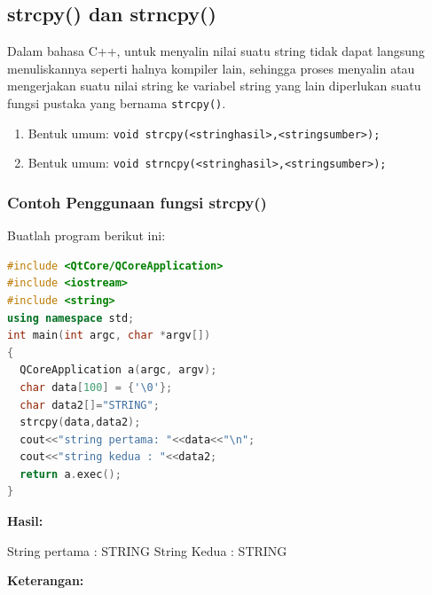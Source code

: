 \subsection{strcpy() dan strncpy()}\label{strcpy-dan-strncpy}

Dalam bahasa C++, untuk menyalin nilai suatu string tidak dapat langsung
menuliskannya seperti halnya kompiler lain, sehingga proses menyalin
atau mengerjakan suatu nilai string ke variabel string yang lain
diperlukan suatu fungsi pustaka yang bernama \texttt{strcpy()}.

\begin{enumerate}

\item
  Bentuk umum:
  \texttt{void\ strcpy(\textless{}stringhasil\textgreater{},\textless{}stringsumber\textgreater{});}
\item
  Bentuk umum:
  \texttt{void\ strncpy(\textless{}stringhasil\textgreater{},\textless{}stringsumber\textgreater{});}
\end{enumerate}

\subsubsection*{Contoh  Penggunaan fungsi strcpy()}

Buatlah program berikut ini:

\begin{lstlisting}[language=c++, caption=Penggunaan fungsi strcpy(), label=contoh3-20]
#include <QtCore/QCoreApplication>
#include <iostream>
#include <string>
using namespace std;
int main(int argc, char *argv[])
{
  QCoreApplication a(argc, argv);
  char data[100] = {'\0'};
  char data2[]="STRING";
  strcpy(data,data2);
  cout<<"string pertama: "<<data<<"\n";
  cout<<"string kedua : "<<data2;
  return a.exec();
}
\end{lstlisting}

\textbf{Hasil:}
\begin{lcverbatim}
String pertama : STRING
String Kedua : STRING
\end{lcverbatim}


\textbf{Keterangan:}

